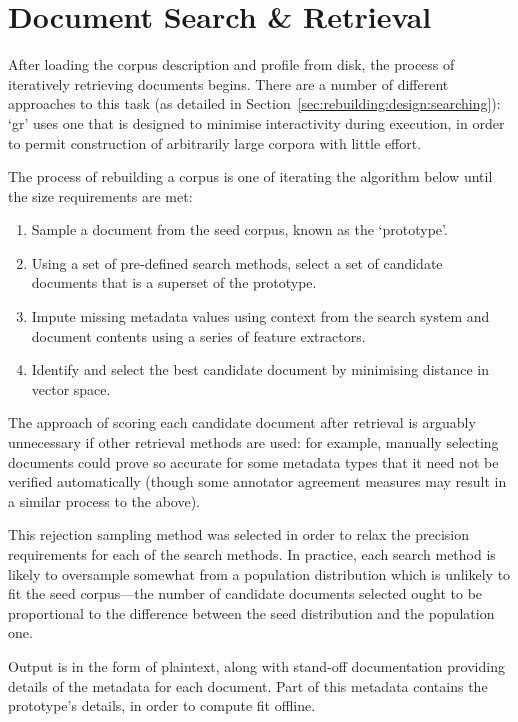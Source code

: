 

\section{Document Search \& Retrieval}
After loading the corpus description and profile from disk, the process of iteratively retrieving documents begins.  There are a number of different approaches to this task (as detailed in Section~\ref{sec:rebuilding:design:searching}): `gr' uses one that is designed to minimise interactivity during execution, in order to permit construction of arbitrarily large corpora with little effort.

The process of rebuilding a corpus is one of iterating the algorithm below until the size requirements are met:

\begin{enumerate}
    \item Sample a document from the seed corpus, known as the `prototype'.
    \item Using a set of pre-defined search methods, select a set of candidate documents that is a superset of the prototype.
    \item Impute missing metadata values using context from the search system and document contents using a series of feature extractors.
    \item Identify and select the best candidate document by minimising distance in vector space.
\end{enumerate}

The approach of scoring each candidate document after retrieval is arguably unnecessary if other retrieval methods are used: for example, manually selecting documents could prove so accurate for some metadata types that it need not be verified automatically (though some annotator agreement measures may result in a similar process to the above).

This rejection sampling method was selected in order to relax the precision requirements for each of the search methods.  In practice, each search method is likely to oversample somewhat from a population distribution which is unlikely to fit the seed corpus---the number of candidate documents selected ought to be proportional to the difference between the seed distribution and the population one.

Output is in the form of plaintext, along with stand-off documentation providing details of the metadata for each document.  Part of this metadata contains the prototype's details, in order to compute fit offline.



